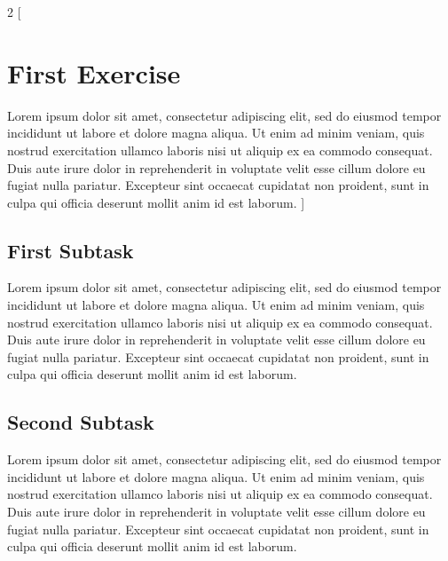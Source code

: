 \documentclass[a4paper, 11pt]{article} %
\begin{document}
\begin{multicols}{2}
    [
        \section{\textbf{First Exercise}}
        Lorem ipsum dolor sit amet, consectetur adipiscing elit, sed do eiusmod tempor
        incididunt ut labore et dolore magna aliqua. Ut enim ad minim veniam, quis nostrud
        exercitation ullamco laboris nisi ut aliquip ex ea commodo consequat. Duis aute
        irure dolor in reprehenderit in voluptate velit esse cillum dolore eu fugiat nulla
        pariatur. Excepteur sint occaecat cupidatat non proident, sunt in culpa qui officia
        deserunt mollit anim id est laborum.
    ]

    \subsection{\textbf{First Subtask}}

    Lorem ipsum dolor sit amet, consectetur adipiscing elit, sed do eiusmod tempor incididunt
    ut labore et dolore magna aliqua. Ut enim ad minim veniam, quis nostrud exercitation
    ullamco laboris nisi ut aliquip ex ea commodo consequat. Duis aute irure dolor in
    reprehenderit in voluptate velit esse cillum dolore eu fugiat nulla pariatur. Excepteur
    sint occaecat cupidatat non proident, sunt in culpa qui officia deserunt mollit anim id
    est laborum.

    \subsection{\textbf{Second Subtask}}

    Lorem ipsum dolor sit amet, consectetur adipiscing elit, sed do eiusmod tempor incididunt
    ut labore et dolore magna aliqua. Ut enim ad minim veniam, quis nostrud exercitation
    ullamco laboris nisi ut aliquip ex ea commodo consequat. Duis aute irure dolor in
    reprehenderit in voluptate velit esse cillum dolore eu fugiat nulla pariatur. Excepteur
    sint occaecat cupidatat non proident, sunt in culpa qui officia deserunt mollit anim id
    est laborum.

\end{multicols}

\bigskip

\end{document}
